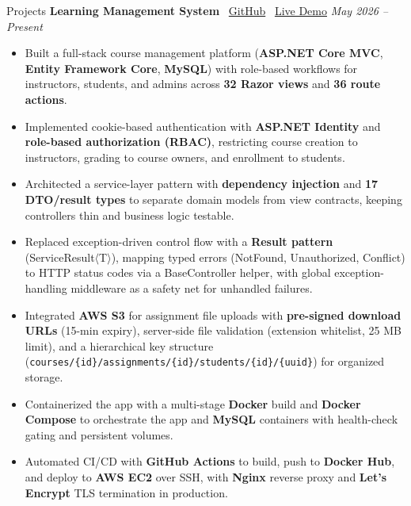 \documentclass{resume}
\begin{document}
\begin{rSection}{Projects}
\textbf{Learning Management System}
\textbar\ \href{https://github.com/jianweicheng0822/learning-management-system}{GitHub}
\textbar\ \href{https://lumis.software}{Live Demo}
\hfill {\em May 2026 -- Present}

\begin{itemize}
\itemsep -3.5pt
\parsep 0pt

\item Built a full-stack course management platform (\textbf{ASP.NET Core MVC}, \textbf{Entity Framework Core}, \textbf{MySQL}) with role-based workflows for instructors, students, and admins across \textbf{32 Razor views} and \textbf{36 route actions}.

\item Implemented cookie-based authentication with \textbf{ASP.NET Identity} and \textbf{role-based authorization (RBAC)}, restricting course creation to instructors, grading to course owners, and enrollment to students.

\item Architected a service-layer pattern with \textbf{dependency injection} and \textbf{17 DTO/result types} to separate domain models from view contracts, keeping controllers thin and business logic testable.

\item Replaced exception-driven control flow with a \textbf{Result pattern} (ServiceResult$\langle$T$\rangle$), mapping typed errors (NotFound, Unauthorized, Conflict) to HTTP status codes via a BaseController helper, with global exception-handling middleware as a safety net for unhandled failures.

\item Integrated \textbf{AWS S3} for assignment file uploads with \textbf{pre-signed download URLs} (15-min expiry), server-side file validation (extension whitelist, 25 MB limit), and a hierarchical key structure (\texttt{courses/\{id\}/assignments/\{id\}/students/\{id\}/\{uuid\}}) for organized storage.

\item Containerized the app with a multi-stage \textbf{Docker} build and \textbf{Docker Compose} to orchestrate the app and \textbf{MySQL} containers with health-check gating and persistent volumes.

\item Automated CI/CD with \textbf{GitHub Actions} to build, push to \textbf{Docker Hub}, and deploy to \textbf{AWS EC2} over SSH, with \textbf{Nginx} reverse proxy and \textbf{Let's Encrypt} TLS termination in production.

\end{itemize}

\end{rSection}
\end{document}
